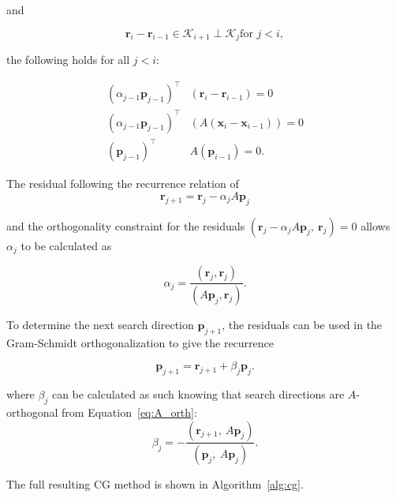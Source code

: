 and 

\begin{equation}
\mathbf{r}_i - \mathbf{r}_{i-1} \in \mathcal{K}_{i+1} \perp \mathcal{K}_j \text{for $j < i$}, 
\end{equation}

the following holds for all $j < i$:

\begin{equation}
    \label{eq:A_orth}
    \begin{aligned}
    \left(\alpha_{j-1}\mathbf{p}_{j-1}\right)^\top& \left(\mathbf{r}_i - \mathbf{r}_{i-1}\right) = 0 \\
    \left(\alpha_{j-1}\mathbf{p}_{j-1}\right)^\top &\left(A \left(\mathbf{x}_i - \mathbf{x}_{i-1}\right)\right) = 0 \\
    \left(\mathbf{p}_{j-1}\right)^\top& A \left(\mathbf{p}_{i-1}\right) = 0.
    \end{aligned}
\end{equation}

The residual following the recurrence relation of
\begin{equation}
    \mathbf{r}_{j+1} = \mathbf{r}_j - \alpha_j A \mathbf{p}_j
\end{equation}

and the orthogonality constraint for the residuals $\left( \mathbf{r}_j - \alpha_j A \mathbf{p}_j,\ \mathbf{r}_j \right) = 0$  allows $\alpha_j$ to be calculated as

\begin{equation}
    \alpha_j = \frac{\left(\mathbf{r}_j, \mathbf{r}_j\right)}{\left(A\mathbf{p}_j, \mathbf{r}_j\right)}.
\end{equation}

To determine the next search direction $\mathbf{p}_{j+1}$, the residuals can be used in the Gram-Schmidt orthogonalization to give the recurrence

\begin{equation}
    \mathbf{p}_{j+1} = \mathbf{r}_{j+1} + \beta_j \mathbf{p}_j.
\end{equation}

where $\beta_j$ can be calculated as such knowing that search directions are $A$-orthogonal from Equation~\ref{eq:A_orth}:
\begin{equation}
    \beta_j = - \frac{\left(\mathbf{r}_{j+1},\ A\mathbf{p}_j\right)}{\left(\mathbf{p}_j,\ A\mathbf{p}_j\right)}.
\end{equation}

The full resulting CG method is shown in Algorithm~\ref{alg:cg}.

